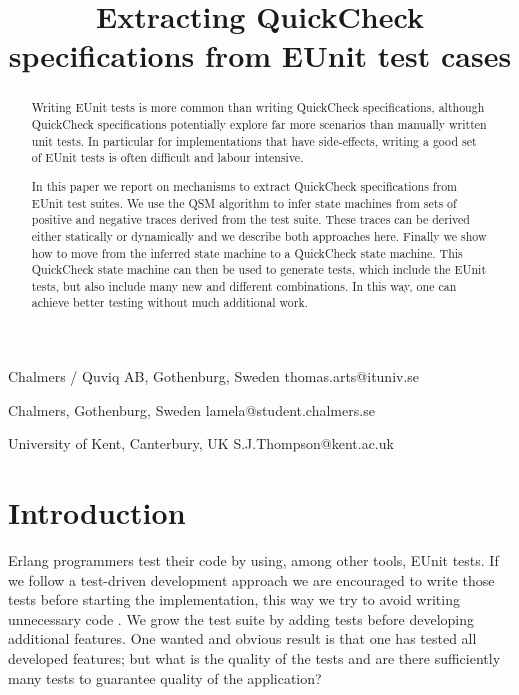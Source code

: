 \documentclass[]{sigplanconf}
\begin{document}
\title{Extracting QuickCheck specifications from EUnit test cases}

                {Chalmers / Quviq AB, Gothenburg, Sweden}
                {thomas.arts@ituniv.se}

                {Chalmers, Gothenburg, Sweden}
                {lamela@student.chalmers.se}

                {University of Kent, Canterbury, UK}
                {S.J.Thompson@kent.ac.uk}



\maketitle

\begin{abstract}
Writing EUnit tests is  more common than writing QuickCheck specifications, although QuickCheck specifications potentially explore far more scenarios than manually written unit tests. 
In particular for implementations that have side-effects, writing a good set of EUnit tests is often difficult and labour intensive.

In this paper we report on mechanisms to extract QuickCheck specifications from EUnit test suites. We use the QSM algorithm to infer state machines from sets of positive and negative traces derived from the test suite. These traces can be derived either statically or dynamically and we describe both approaches here. Finally we show how to move from the inferred state machine to a QuickCheck state machine. This QuickCheck state machine can then be used to generate tests, which include the EUnit tests, but also include many new and different combinations. In this way, one can achieve better testing without much additional work.
\end{abstract}

\section{Introduction}

Erlang programmers test their code by using, among other tools,
EUnit tests. If we follow a test-driven development approach we are
encouraged to write those tests before starting the implementation,
this way we try to avoid writing unnecessary code \cite{beck2003test}. We grow
the test suite by adding tests before developing additional features. One wanted and
obvious result is that one has tested all developed features; but what is the quality of the 
tests and are there sufficiently many tests to guarantee quality of the application?
\end{document}
